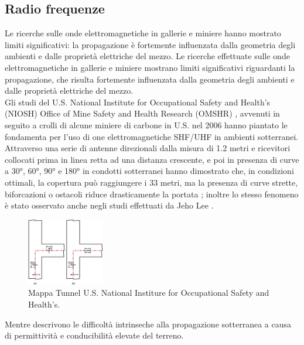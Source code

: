 \subsection{Radio frequenze}
Le ricerche sulle onde elettromagnetiche in gallerie e miniere hanno mostrato
limiti significativi: la propagazione è fortemente influenzata dalla geometria degli
ambienti e dalle proprietà elettriche del mezzo.
Le ricerche effettuate sulle onde elettromagnetiche in gallerie e miniere 
mostrano limiti significativi riguardanti la propagazione, che risulta fortemente influenzata 
dalla geometria degli ambienti e dalle proprietà elettriche del mezzo.\\
Gli studi del U.S. National Institute for Occupational Safety and Health’s (NIOSH) Office of Mine Safety and Health Research (OMSHR)
\citep{jacksha2016}, avvenuti in seguito a crolli di alcune miniere di carbone
in U.S. nel 2006 hanno piantato le fondamenta per l'uso di one elettromagnetiche SHF/UHF in ambienti sotterranei.\\
Attraverso una serie di antenne direzionali dalla misura di 1.2 metri e ricevitori collocati prima in linea
retta ad una distanza crescente, e poi in presenza di curve a 30°, 60°, 90° e 180° in condotti sotterranei 
hanno dimostrato che, in condizioni ottimali, la copertura può raggiungere i 33 metri, ma la presenza di curve strette, biforcazioni
 o ostacoli riduce drasticamente la portata \citep[sec.~3]{jacksha2016};
 inoltre lo stesso fenomeno è stato osservato anche negli studi effettuati da Jeho Lee \citep[p.~59]{Lee2000_RadioWavePropagationTunnels}.

\begin{figure}[H]
    \centering
    \includegraphics[width=0.30\textwidth]{immagini/corner_em.jpg}
    \caption{Mappa Tunnel U.S. National Institure for Occupational Safety and Health's\citep[sec.~3]{jacksha2016}.}
    \label{fig:esempio}
\end{figure}
Mentre
\citep[sec.~2]{akyildiz2006} descrivono le difficoltà intrinseche alla
propagazione sotterranea a causa di permittività e conducibilità elevate del terreno.\\

